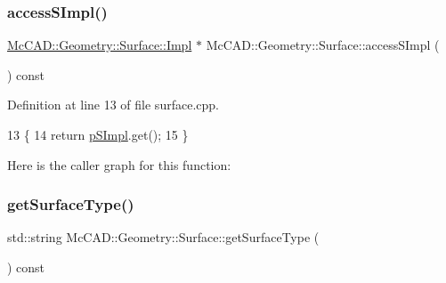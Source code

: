 \mbox{\label{classMcCAD_1_1Geometry_1_1Surface_a989de1f9ebe3de043412014ed25e52eb}} 
\subsubsection{\texorpdfstring{access\+S\+Impl()}{accessSImpl()}\hspace{0.1cm}{\footnotesize\ttfamily [2/2]}}
{\footnotesize\ttfamily \hyperlink{classMcCAD_1_1Geometry_1_1Surface_1_1Impl}{Mc\+C\+A\+D\+::\+Geometry\+::\+Surface\+::\+Impl} $\ast$ Mc\+C\+A\+D\+::\+Geometry\+::\+Surface\+::access\+S\+Impl (\begin{DoxyParamCaption}{ }\end{DoxyParamCaption}) const\hspace{0.3cm}{\ttfamily [inherited]}}



Definition at line 13 of file surface.\+cpp.


\begin{DoxyCode}
13                                        \{
14   \textcolor{keywordflow}{return} \hyperlink{classMcCAD_1_1Geometry_1_1Surface_a0097d4e9bfc1c7cd7cd33d81492b9100}{pSImpl}.get();
15 \}
\end{DoxyCode}
Here is the caller graph for this function\+:
\mbox{\label{classMcCAD_1_1Geometry_1_1Surface_ac81308cae2d3fd458dfa311adea23688}} 
\subsubsection{\texorpdfstring{get\+Surface\+Type()}{getSurfaceType()}\hspace{0.1cm}{\footnotesize\ttfamily [1/2]}}
{\footnotesize\ttfamily std\+::string Mc\+C\+A\+D\+::\+Geometry\+::\+Surface\+::get\+Surface\+Type (\begin{DoxyParamCaption}{ }\end{DoxyParamCaption}) const\hspace{0.3cm}{\ttfamily [inherited]}}



